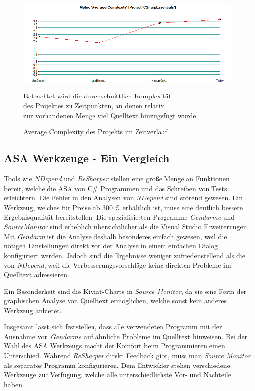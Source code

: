 \begin{figure}[!ht]
	\centering
	\includegraphics[width=\textwidth]{images/source-monitor-avg-complexity-over-time.png}
	\caption{Average Complexity des Projekts im Zeitverlauf}
	\vspace{0.1cm}
	Betrachtet wird die durchschnittlich Komplexität \\ des Projektes zu Zeitpunkten, an denen relativ \\ zur vorhandenen Menge viel Quelltext hinzugefügt wurde.
	\label{fig:source-monitor-time-metric-chart}
\end{figure}

\newpage

\subsection{ASA Werkzeuge - Ein Vergleich}
Tools wie \emph{NDepend} und \emph{ReSharper} stellen eine große Menge an Funktionen bereit, welche die ASA von C\# Programmen und das Schreiben von Tests erleichtern. Die Fehler in den Analysen von \emph{NDepend} sind störend gewesen. Ein Werkzeug, welches für Preise ab 300 \euro ~erhältlich ist, muss eine deutlich bessere Ergebnisqualität bereitstellen. Die spezialisierten Programme \emph{Gendarme} und \emph{SourceMonitor} sind erheblich übersichtlicher als die Visual Studio Erweiterungen. Mit \emph{Gendarm} ist die Analyse deshalb besonderes einfach gewesen, weil die nötigen Einstellungen direkt vor der Analyse in einem einfachen Dialog konfiguriert werden. Jedoch sind die Ergebnisse weniger zufriedenstellend als die von \emph{NDepend}, weil die Verbesserungsvorschläge keine direkten Probleme im Quelltext adressieren.

Ein Besonderheit sind die Kiviat-Charts in \emph{Source Monitor}, da sie eine Form der graphischen Analyse von Quelltext ermöglichen, welche sonst kein anderes Werkzeug anbietet.

Insgesamt lässt sich feststellen, dass alle verwendeten Programm mit der Ausnahme von \emph{Gendarme} auf ähnliche Probleme im Quelltext hinweisen. Bei der Wahl des ASA Werkzeugs macht der Komfort beim Programmieren einen Unterschied. Während \emph{ReSharper} direkt Feedback gibt, muss man \emph{Source Monitor} als separates Programm konfigurieren. Dem Entwickler stehen verschiedene Werkzeuge zur Verfügung, welche alle unterschiedlichste Vor- und Nachteile haben.
